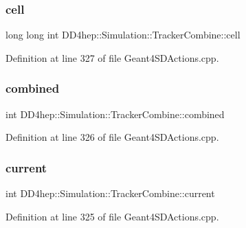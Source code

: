 \subsubsection{\texorpdfstring{cell}{cell}}
{\footnotesize\ttfamily long long int D\+D4hep\+::\+Simulation\+::\+Tracker\+Combine\+::cell}



Definition at line 327 of file Geant4\+S\+D\+Actions.\+cpp.

\hypertarget{struct_d_d4hep_1_1_simulation_1_1_tracker_combine_a09c500ccd4bca917b081930ae9e2c5ce}{}\label{struct_d_d4hep_1_1_simulation_1_1_tracker_combine_a09c500ccd4bca917b081930ae9e2c5ce} 
\subsubsection{\texorpdfstring{combined}{combined}}
{\footnotesize\ttfamily int D\+D4hep\+::\+Simulation\+::\+Tracker\+Combine\+::combined}



Definition at line 326 of file Geant4\+S\+D\+Actions.\+cpp.

\hypertarget{struct_d_d4hep_1_1_simulation_1_1_tracker_combine_aa8bb9faf2d8ce6bac98f969e5bb9943c}{}\label{struct_d_d4hep_1_1_simulation_1_1_tracker_combine_aa8bb9faf2d8ce6bac98f969e5bb9943c} 
\subsubsection{\texorpdfstring{current}{current}}
{\footnotesize\ttfamily int D\+D4hep\+::\+Simulation\+::\+Tracker\+Combine\+::current}



Definition at line 325 of file Geant4\+S\+D\+Actions.\+cpp.

\hypertarget{struct_d_d4hep_1_1_simulation_1_1_tracker_combine_acd9b60d0c1b8cee45c1745a4ae167d24}{}\label{struct_d_d4hep_1_1_simulation_1_1_tracker_combine_acd9b60d0c1b8cee45c1745a4ae167d24} 
